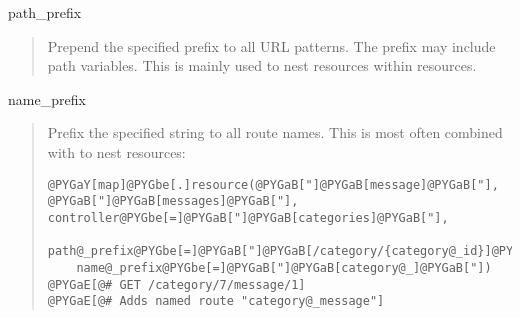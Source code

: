 \documentclass[letterpaper,10pt,english]{manual}
\begin{document}
path\_prefix
\begin{quote}

Prepend the specified prefix to all URL patterns.  The prefix may include
path variables.  This is mainly used to nest resources within resources.
\end{quote}

name\_prefix
\begin{quote}

Prefix the specified string to all route names.  This is most often
combined with  to nest resources:

\begin{Verbatim}[commandchars=@\[\]]
@PYGaY[map]@PYGbe[.]resource(@PYGaB["]@PYGaB[message]@PYGaB["], @PYGaB["]@PYGaB[messages]@PYGaB["], controller@PYGbe[=]@PYGaB["]@PYGaB[categories]@PYGaB["],
    path@_prefix@PYGbe[=]@PYGaB["]@PYGaB[/category/{category@_id}]@PYGaB["],
    name@_prefix@PYGbe[=]@PYGaB["]@PYGaB[category@_]@PYGaB["])
@PYGaE[@# GET /category/7/message/1]
@PYGaE[@# Adds named route "category@_message"]
\end{Verbatim}
\end{quote}
\end{document}
